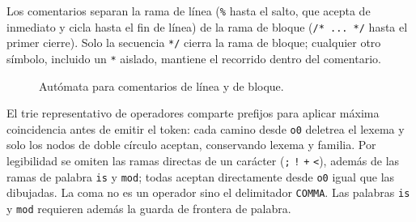 \documentclass[11pt,letterpaper]{article}
\newcommand{\code}[1]{{\ttfamily\small #1}}
\begin{document}
Los comentarios separan la rama de línea (\texttt{\%} hasta el salto, que acepta de inmediato y cicla hasta el fin de línea) de la rama de bloque (\texttt{/* ... */} hasta el primer cierre). Solo la secuencia \texttt{*/} cierra la rama de bloque; cualquier otro símbolo, incluido un \texttt{*} aislado, mantiene el recorrido dentro del comentario.

\begin{figure}[H]
  \centering
  \caption{Autómata para comentarios de línea y de bloque.}
\end{figure}

El trie representativo de operadores comparte prefijos para aplicar máxima coincidencia antes de emitir el token: cada camino desde \texttt{o0} deletrea el lexema y solo los nodos de doble círculo aceptan, conservando lexema y familia. Por legibilidad se omiten las ramas directas de un carácter (\texttt{;} \texttt{!} \texttt{+} \texttt{<}), además de las ramas de palabra \texttt{is} y \texttt{mod}; todas aceptan directamente desde \texttt{o0} igual que las dibujadas. La coma no es un operador sino el delimitador \texttt{COMMA}. Las palabras \texttt{is} y \texttt{mod} requieren además la guarda de frontera de palabra.
\end{document}
